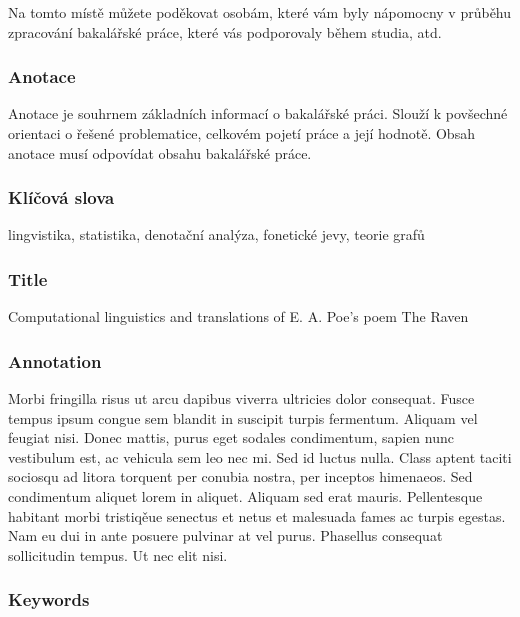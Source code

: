 \documentclass[11pt,a4paper,fleqn,titlepage,twoside,openany,export]{book}
\begin{document}
Na tomto místě můžete poděkovat osobám, které vám byly nápomocny v průběhu zpracování bakalářské práce, které vás podporovaly během studia, atd.

\newpage 
\thispagestyle{empty}
\subsubsection*{Anotace}

Anotace je souhrnem základních informací o bakalářské práci. Slouží k povšechné orientaci o řešené problematice, celkovém pojetí práce a její hodnotě. Obsah anotace musí odpovídat obsahu bakalářské práce.

\vspace*{0.8cm}\subsubsection*{Klíčová slova} 	 	 		

lingvistika, statistika, denotační analýza, fonetické jevy, teorie grafů

\vspace*{2.8cm}\subsubsection*{Title}
Computational linguistics and translations of E. A. Poe's poem The Raven

\vspace*{0.8cm}\subsubsection*{Annotation}

Morbi fringilla risus ut arcu dapibus viverra ultricies dolor consequat. Fusce tempus ipsum congue sem blandit in suscipit turpis fermentum. Aliquam vel feugiat nisi. Donec mattis, purus eget sodales condimentum, sapien nunc vestibulum est, ac vehicula sem leo nec mi. Sed id luctus nulla. Class aptent taciti sociosqu ad litora torquent per conubia nostra, per inceptos himenaeos. Sed condimentum aliquet lorem in aliquet. Aliquam sed erat mauris. Pellentesque habitant morbi tristiqěue senectus et netus et malesuada fames ac turpis egestas. Nam eu dui in ante posuere pulvinar at vel purus. Phasellus consequat sollicitudin tempus. Ut nec elit nisi. 

\vspace*{0.8cm}\subsubsection*{Keywords}
\end{document}
